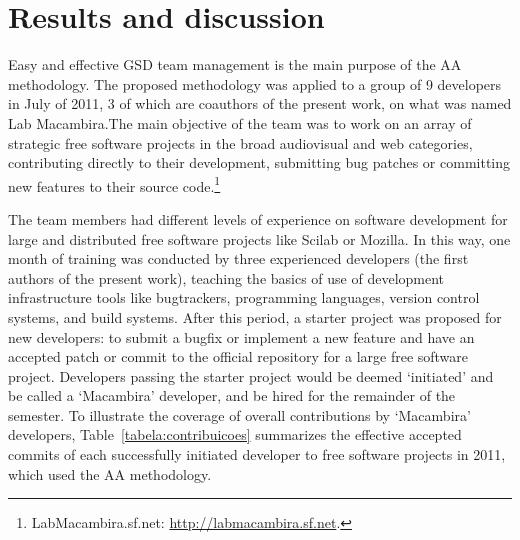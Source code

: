 \documentclass{article}
\begin{document}

\section{Results and discussion}
\label{results}

Easy and effective GSD team management is the main purpose of the AA
methodology. The proposed methodology was applied to a group of 9 developers in
July of 2011, 3 of which are coauthors of the present work, on what was named Lab
Macambira.The main objective of the team was to work on an array of strategic free software
projects in the broad audiovisual and web categories, contributing directly to
their development, submitting bug patches or committing new features to their
source code.\footnote{LabMacambira.sf.net: \url{http://labmacambira.sf.net}.} 

The team members had different levels of experience on software development for
large and distributed free software projects like Scilab or Mozilla. In this
way, one month of training was conducted by three experienced developers (the
first authors of the present work), teaching
the basics of use of development infrastructure tools like bugtrackers, programming
languages, version control systems, and build systems. After this period, a
starter project was proposed for new developers: to submit a bugfix or implement
a new feature and have an accepted
patch or commit to the official repository for a large free
software project.  Developers passing the starter project would be deemed
`initiated' and be called a `Macambira' developer, and be hired for the
remainder of the semester.
To illustrate the coverage of overall contributions by `Macambira' developers, Table~\ref{tabela:contribuicoes} summarizes the effective accepted commits
of each successfully initiated developer to free software projects in 2011,
which used the AA methodology.

\end{document}
